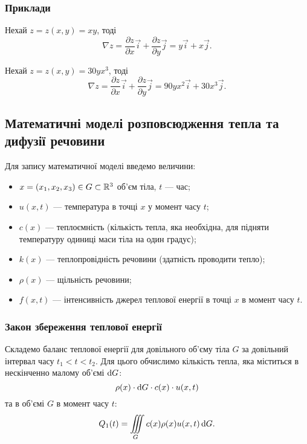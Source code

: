 \subsubsection{Приклади}

\begin{example}
	Нехай $z = z(x, y) = x y$, тоді
	\begin{equation}
		\nabla z = \frac{\partial z}{\partial x} \vec{i} + \frac{\partial z}{\partial y} \vec{j} = y \vec{i} + x \vec{j}.
	\end{equation}
\end{example}

\begin{example}
	Нехай $z = z(x, y) = 30 y x^3$, тоді
	\begin{equation}
		\nabla z = \frac{\partial z}{\partial x} \vec{i} + \frac{\partial z}{\partial y} \vec{j} = 90 y x^2 \vec{i} + 30 x^3 \vec{j}.
	\end{equation}
\end{example}

\subsection{Математичні моделі розповсюдження тепла та дифузії речовини}

Для запису математичної моделі введемо величини:
\begin{itemize}
	\item $x = (x_1, x_2, x_3) \in G \subset \mathbb{R}^3$ об'єм тіла, $t$ --- час;
	\item $u(x, t)$ --- температура в точці $x$ у момент часу $t$;
	\item $c(x)$ --- теплоємність (кількість тепла, яка необхідна, для підняти температуру одиниці маси тіла на один градус);
	\item $k(x)$ --- теплопровідність речовини (здатність проводити тепло);
	\item $\rho(x)$ --- щільність речовини;
	\item $f(x, t)$ --- інтенсивність джерел теплової енергії в точці $x$ в момент часу $t$.
\end{itemize}

\subsubsection{Закон збереження теплової енергії}

Складемо баланс теплової енергії для довільного об'єму тіла $G$ за довільний інтервал часу $t_1 < t < t_2$. Для цього обчислимо кількість тепла, яка міститься в нескінченно малому об'ємі $\mathop{}\!\mathrm{d} G$: 
\begin{equation}
	\rho(x) \cdot \mathop{}\!\mathrm{d} G \cdot c(x) \cdot u(x, t)
\end{equation}
та в об'ємі $G$ в момент часу $t$:
\begin{equation}
	Q_1(t) = \displaystyle\iiint\limits_G c(x) \rho(x) u(x, t) \mathop{}\!\mathrm{d} G.
\end{equation}

